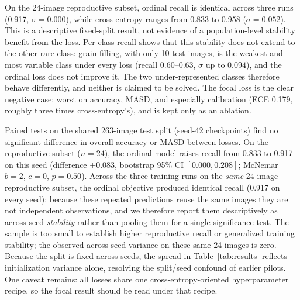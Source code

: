 \documentclass[conference,a4paper]{IEEEtran}
\begin{document}
\begin{table}[t]
\centering
\caption{Vision on the 2{,}900-image derived-stage benchmark. Three training seeds (42, 7, 123) on one fixed split: mean $\pm$ std. Labels are morphology-derived, not expert verified.}
\label{tab:results}
\small
{}
\end{table}




On the 24-image reproductive subset, ordinal recall is identical across three runs (0.917, $\sigma=0.000$), while cross-entropy ranges from 0.833 to 0.958 ($\sigma=0.052$). This is a descriptive fixed-split result, not evidence of a population-level stability benefit from the loss. Per-class recall shows that this stability does not extend to the other rare class: grain filling, with only 10 test images, is the weakest and most variable class under every loss (recall $0.60$--$0.63$, $\sigma$ up to $0.094$), and the ordinal loss does not improve it. The two under-represented classes therefore behave differently, and neither is claimed to be solved. The focal loss is the clear negative case: worst on accuracy, MASD, and especially calibration (ECE 0.179, roughly three times cross-entropy's), and is kept only as an ablation.

Paired tests on the shared 263-image test split (seed-42 checkpoints) find no significant difference in overall accuracy or MASD between losses. On the reproductive subset ($n=24$), the ordinal model raises recall from 0.833 to 0.917 on this seed (difference $+0.083$, bootstrap 95\% CI $[0.000,0.208]$; McNemar $b{=}2$, $c{=}0$, $p{=}0.50$). Across the three training runs on the \emph{same} 24-image reproductive subset, the ordinal objective produced identical recall (0.917 on every seed); because these repeated predictions reuse the same images they are not independent observations, and we therefore report them descriptively as across-seed \emph{stability} rather than pooling them for a single significance test. The sample is too small to establish higher reproductive recall or generalized training stability; the observed across-seed variance on these same 24 images is zero. Because the split is fixed across seeds, the spread in Table~\ref{tab:results} reflects initialization variance alone, resolving the split/seed confound of earlier pilots. One caveat remains: all losses share one cross-entropy-oriented hyperparameter recipe, so the focal result should be read under that recipe.
\end{document}
